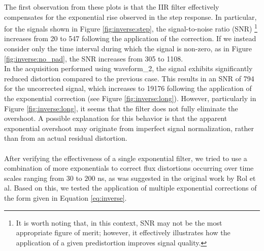 The first observation from these plots is that the IIR filter effectively compensates for the exponential rise observed in the step response.
%
In particular, for the signals shown in Figure \ref{fig:inverse:step}, the signal-to-noise ratio (SNR)
\footnote{It is worth noting that, in this context, SNR may not be the most appropriate figure of merit; however, it effectively illustrates how the application of a given predistortion improves signal quality.} 
increases from 20 to 547 following the application of the correction.
If we instead consider only the time interval during which the signal is non-zero, as in Figure \ref{fig:inverse:no_pad}, the SNR increases from 305 to 1108.\\
In the acquisition performed using waveform\_2, the signal exhibits significantly reduced distortion compared to the previous case. 
This results in an SNR of 794 for the uncorrected signal, which increases to 19176 following the application of the exponential correction (see Figure \ref{fig:inverse:long}).
%
However, particularly in Figure \ref{fig:inverse:long}, it seems that the filter does not fully eliminate the overshoot. 
A possible explanation for this behavior is that the apparent exponential overshoot may originate from imperfect signal normalization, rather than from an actual residual distortion.
\paragraph{}
After verifying the effectiveness of a single exponential filter, we tried to use a combination of more exponentials to correct flux distortions occurring over time scales ranging from $30$ to $200$ ns, as was suggested in the original work by Rol et al. 
Based on this, we tested the application of multiple exponential corrections of the form given in Equation \ref{eq:inverse}.

